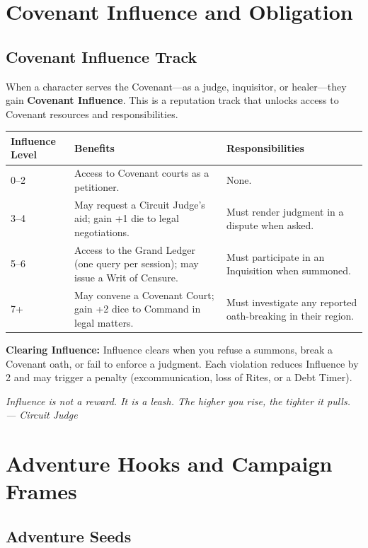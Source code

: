 \documentclass{book}
\newcommand{\citation}[1]{\textcolor{marginalia}{\small\textit{#1}}}
\begin{document}
\chapter{Covenant Influence and Obligation}

\section{Covenant Influence Track}

When a character serves the Covenant---as a judge, inquisitor, or healer---they gain \textbf{Covenant Influence}. This is a reputation track that unlocks access to Covenant resources and responsibilities.

\begin{center}
\begin{tabular}{p{3cm} p{5cm} p{6cm}}
\toprule
\textbf{Influence Level} & \textbf{Benefits} & \textbf{Responsibilities} \\
\midrule
0--2 & Access to Covenant courts as a petitioner. & None. \\
3--4 & May request a Circuit Judge's aid; gain +1 die to legal negotiations. & Must render judgment in a dispute when asked. \\
5--6 & Access to the Grand Ledger (one query per session); may issue a Writ of Censure. & Must participate in an Inquisition when summoned. \\
7+ & May convene a Covenant Court; gain +2 dice to Command in legal matters. & Must investigate any reported oath-breaking in their region. \\
\bottomrule
\end{tabular}
\end{center}

\textbf{Clearing Influence:} Influence clears when you refuse a summons, break a Covenant oath, or fail to enforce a judgment. Each violation reduces Influence by 2 and may trigger a penalty (excommunication, loss of Rites, or a Debt Timer).

\citation{Influence is not a reward. It is a leash. The higher you rise, the tighter it pulls. --- Circuit Judge}

\chapter{Adventure Hooks and Campaign Frames}

\section{Adventure Seeds}
\end{document}
